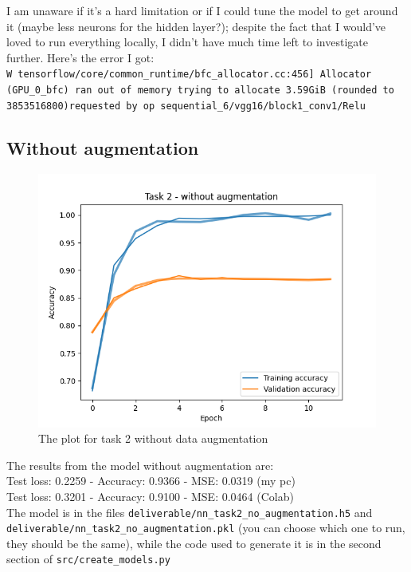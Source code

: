 \documentclass[11pt]{scrartcl}
\begin{document}
	I am unaware if it's a hard limitation or if I could tune the model to get around it (maybe less neurons for the hidden layer?); despite the fact that I would've loved to run everything locally, I didn't have much time left to investigate further. Here's the error I got:\\
	\texttt{W tensorflow/core/common\_runtime/bfc\_allocator.cc:456] Allocator (GPU\_0\_bfc) ran
	out of memory trying to allocate 3.59GiB (rounded to 3853516800)requested by op
	sequential\_6/vgg16/block1\_conv1/Relu}


	\subsection*{Without augmentation}

		\begin{figure}[H]
			\centering
			\includegraphics[width=\textwidth]{src/plot_task2_no_augmentation.png}
			\caption{The plot for task 2 without data augmentation}
			\label{fig:plot_T2_1}
		\end{figure}

		The results from the model without augmentation are:\\
		
		Test loss: 0.2259 - Accuracy: 0.9366 - MSE: 0.0319 (my pc)\\
		Test loss: 0.3201 - Accuracy: 0.9100 - MSE: 0.0464 (Colab)\\

		The model is in the files \texttt{deliverable/nn\_task2\_no\_augmentation.h5} and\\ 
		\texttt{deliverable/nn\_task2\_no\_augmentation.pkl} (you can choose which one to run, they should be the same), while the code used to generate 
		it is in the second section of \texttt{src/create\_models.py}
\end{document}
